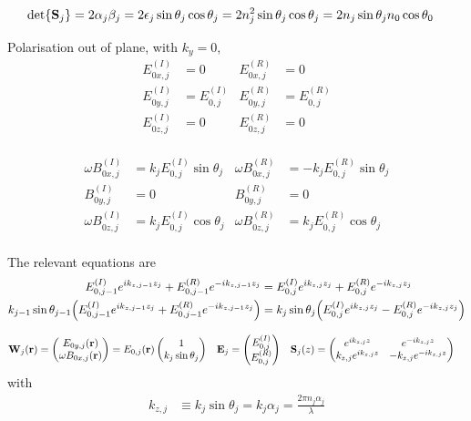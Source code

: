 \begin{align*}
	\det{\vb{S}_j} &= 2\alpha_j\beta_j = 2\epsilon_j\sin\theta_j\cos\theta_j = 2n^2_j\sin\theta_j\cos\theta_j = 2n_j\sin\theta_j n_0\cos\theta_0
\end{align*}

Polarisation out of plane, with $k_y = 0$,
\begin{align*}
	E^{(I)}_{0x,j} &= 0 & E^{(R)}_{0x,j} &= 0 \\
	E^{(I)}_{0y,j} &= E^{(I)}_{0,j} & E^{(R)}_{0y,j} &= E^{(R)}_{0,j} \\
	E^{(I)}_{0z,j} &= 0 & E^{(R)}_{0z,j} &= 0 \\
\end{align*}

\begin{align*}
	\omega B^{(I)}_{0x,j} &= k_j E^{(I)}_{0,j}\sin\theta_j & \omega B^{(R)}_{0x,j} &= -k_j E^{(R)}_{0,j}\sin\theta_j \\
	B^{(I)}_{0y,j} &= 0 & B^{(R)}_{0y,j} &= 0 \\
	\omega B^{(I)}_{0z,j} &= k_j E^{(I)}_{0,j}\cos\theta_j & \omega B^{(R)}_{0z,j} &= k_j E^{(R)}_{0,j}\cos\theta_j \\
\end{align*}

The relevant equations are
\begin{align*}
	E^{(I)}_{0,j-1}e^{ik_{z,j-1}z_j} + E^{(R)}_{0,j-1}e^{-ik_{z,j-1}z_j} &=
	E^{(I)}_{0,j}e^{ik_{z,j}z_j} + E^{(R)}_{0,j} e^{-ik_{z,j}z_j}
	\\
	k_{j-1}\sin\theta_{j-1}\pqty{E^{(I)}_{0,j-1}e^{ik_{z,j-1}z_j} + E^{(R)}_{0,j-1}e^{-ik_{z,j-1}z_j}} &=
	k_{j}\sin\theta_{j}\pqty{E^{(I)}_{0,j}e^{ik_{z,j}z_j} - E^{(R)}_{0,j}e^{-ik_{z,j}z_j}} 
\end{align*}

\begin{align*}
	\vb{W}_j\pqty{\vb{r}} &= \pmqty{E_{0y,j}\pqty{\vb{r}} \\ \omega B_{0x,j}\pqty{\vb{r}} } = E_{0,j}\pqty{\vb{r}}\pmqty{1 \\ k_j\sin\theta_j  } 
	&\vb{E}_j &= \pmqty{E_{0,j}^{(I)} \\ E_{0,j}^{(R)}} 
	& 
	\vb{S}_j\pqty{z} &= \pmqty{
		e^{ik_{z,j}z} & 
		e^{-ik_{z,j}z}  \\
		k_{z,j} e^{ik_{z,j}z} & 
		-k_{z,j} e^{-ik_{z,j}z}
		}
\end{align*} with
\begin{align*}
	k_{z,j} &\equiv k_{j}\sin\theta_{j} = k_j\alpha_j = \frac{2\pi n_j\alpha_j}{\lambda}
\end{align*}

